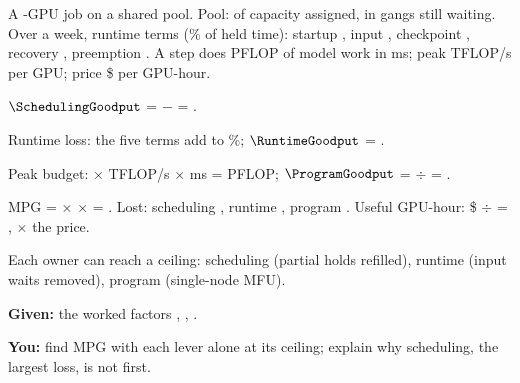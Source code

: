 \documentclass{studysheet}
\begin{document}
\begin{leftcol}
\begin{practicebox}
A -GPU job on a shared pool. Pool:  of capacity assigned,  in gangs still waiting.
Over a week, runtime terms (\% of held time): startup , input ,
checkpoint , recovery , preemption .
A step does  PFLOP of model work in  ms; peak  TFLOP/s per GPU; price \$ per GPU-hour.
\begin{steps}
\item $\SchedulingGoodput$ =  $-$  = .
\item Runtime loss: the five terms add to \%; $\RuntimeGoodput$ = .
\item Peak budget:  $\times$  TFLOP/s $\times$  ms =  PFLOP;
  $\ProgramGoodput$ =  $\div$  = .
\item MPG =  $\times$  $\times$  = . Lost: scheduling ,
  runtime , program . Useful GPU-hour: \$ $\div$  = , $\times$ the price.
\end{steps}
\end{practicebox}

\vspace{10pt}
\begin{practicebox}
Each owner can reach a ceiling: scheduling  (partial holds refilled), runtime 
(input waits removed), program  (single-node MFU).\par\vspace{4pt}
\textbf{Given:} the worked factors , , .\par
\textbf{You:} find MPG with each lever alone at its ceiling; explain why scheduling, the largest loss, is not first.
\end{practicebox}
\end{leftcol}%
\end{document}
